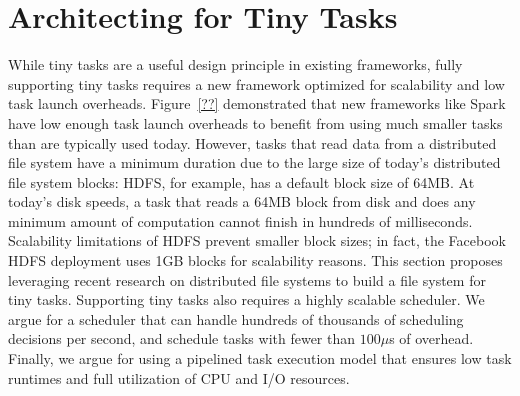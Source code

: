 \section{Architecting for Tiny Tasks}
While tiny tasks are a useful design principle in existing frameworks, fully
supporting tiny tasks requires a new framework optimized for scalability and
low task launch overheads. Figure~\ref{??} demonstrated that new frameworks
like Spark have low enough task launch overheads to benefit from using much
smaller tasks than are typically used today. However, tasks that read data
from a distributed file system have a minimum duration due to the large size
of today's distributed file system blocks: HDFS, for example, has a default
block size of 64MB. At today's disk speeds, a task that reads a 64MB block
from disk and does any minimum amount of computation cannot finish in hundreds of
milliseconds. Scalability limitations of HDFS prevent smaller block sizes;
in fact, the Facebook HDFS deployment uses 1GB blocks for scalability reasons.
This section proposes leveraging recent research on distributed file systems
to build a file system for tiny tasks. Supporting tiny tasks also requires a
highly scalable scheduler. We argue for a scheduler that can handle hundreds of
thousands of scheduling decisions per second, and schedule tasks with fewer
than $100\mu$s of overhead. Finally, we argue for using a pipelined task
execution model that ensures low task runtimes and full utilization of CPU
and I/O resources.


